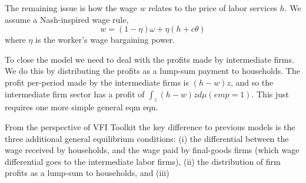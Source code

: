 The remaining issue is how the wage $w$ relates to the price of labor services $h$. We assume a Nash-inspired wage rule,
\begin{equation*}
 w=(1-\eta) \omega + \eta (h+ c \theta)
\end{equation*}
where $\eta$ is the worker's wage bargaining power.

To close the model we need to deal with the profits made by intermediate firms. We do this by distributing the profits as a lump-sum payment to households. The profit per-period made by the intermediate firms is $(h-w)z$, and so the intermediate firm sector has a profit of $\int_z (h-w)z d\mu(emp=1)$. This just requires one more simple general eqm eqn.

From the perspective of VFI Toolkit the key difference to previous models is the three additional general equilibrium conditions: (i) the differential between the wage received by households, and the wage paid by final-goods firms (which wage differential goes to the intermediate labor firms), (ii) the distribution of firm profits as a lump-sum to households, and (iii)




